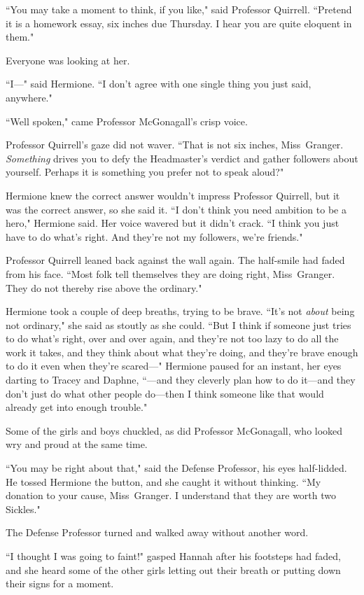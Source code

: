 ``You may take a moment to think, if you like," said Professor Quirrell. ``Pretend it is a homework essay, six inches due Thursday. I hear you are quite eloquent in them."

Everyone was looking at her.

``I---" said Hermione. ``I don't agree with one single thing you just said, anywhere."

``Well spoken," came Professor McGonagall's crisp voice.

Professor Quirrell's gaze did not waver. ``That is not six inches, Miss~Granger. \emph{Something} drives you to defy the Headmaster's verdict and gather followers about yourself. Perhaps it is something you prefer not to speak aloud?"

Hermione knew the correct answer wouldn't impress Professor Quirrell, but it was the correct answer, so she said it. ``I don't think you need ambition to be a hero," Hermione said. Her voice wavered but it didn't crack. ``I think you just have to do what's right. And they're not my followers, we're friends."

Professor Quirrell leaned back against the wall again. The half-smile had faded from his face. ``Most folk tell themselves they are doing right, Miss~Granger. They do not thereby rise above the ordinary."

Hermione took a couple of deep breaths, trying to be brave. ``It's not \emph{about} being not ordinary," she said as stoutly as she could. ``But I think if someone just tries to do what's right, over and over again, and they're not too lazy to do all the work it takes, and they think about what they're doing, and they're brave enough to do it even when they're scared---" Hermione paused for an instant, her eyes darting to Tracey and Daphne, ``---and they cleverly plan how to do it---and they don't just do what other people do---then I think someone like that would already get into enough trouble."

Some of the girls and boys chuckled, as did Professor McGonagall, who looked wry and proud at the same time.

``You may be right about that," said the Defense Professor, his eyes half-lidded. He tossed Hermione the button, and she caught it without thinking. ``My donation to your cause, Miss~Granger. I understand that they are worth two Sickles."

The Defense Professor turned and walked away without another word.

``I thought I was going to faint!" gasped Hannah after his footsteps had faded, and she heard some of the other girls letting out their breath or putting down their signs for a moment.

